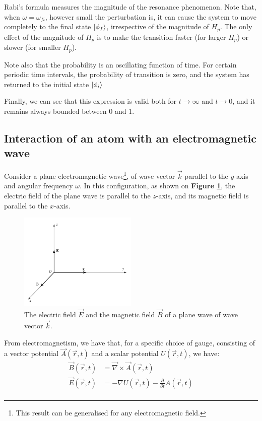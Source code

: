 Rabi's formula measures the magnitude of the resonance phenomenon. Note that, when $\omega=\omega_{fi}$, however small the perturbation is, it can cause the system to move completely to the final state $\ket{\phi_f}$, irrespective of the magnitude of $H_p$. The only effect of the magnitude of $H_p$ is to make the transition faster (for larger $H_p$) or slower (for smaller $H_p$).

Note also that the probability is an oscillating function of time. For certain periodic time intervals, the probability of transition is zero, and the system has returned to the initial state $\ket{\phi_i}$

Finally, we can see that this expression is valid both for $t\to \infty$ and $t\to 0$, and it remains always bounded between $0$ and $1$.

\iffalse
\subsection{Interaction of an atom with an electromagnetic wave}

Consider a plane electromagnetic wave\footnote{This result can be generalised for any electromagnetic field.}, of wave vector $\vec k$ parallel to the $y$-axis and angular frequency $\omega$. In this configuration, as shown on \textbf{Figure \ref{fig:plane_em_wave}}, the electric field of the plane wave is parallel to the $z$-axis, and its magnetic field is parallel to the $x$-axis.

\begin{figure}[htbp]
    \centering
    \includegraphics[width=0.5\textwidth]{images/plane_em_wave.png}
    \caption{The electric field $\vec{E}$ and the magnetic field $\vec B$ of a plane wave of wave vector $\vec k$.}
    \label{fig:plane_em_wave}
\end{figure}

From electromagnetism, we have that, for a specific choice of gauge, consisting of a vector potential $\vec A(\vec r, t)$ and a scalar potential $U(\vec r, t)$, we have:
\begin{equation} \label{potential_electric_magnetic}
    \begin{split}
        \vec{B}(\vec r, t) &= \vec{\nabla} \times \vec A(\vec r, t)\\
        \vec{E}(\vec r, t) &= -\nabla U(\vec r, t) - \frac{\partial}{\partial t} A(\vec r, t)\\
    \end{split}
\end{equation}

